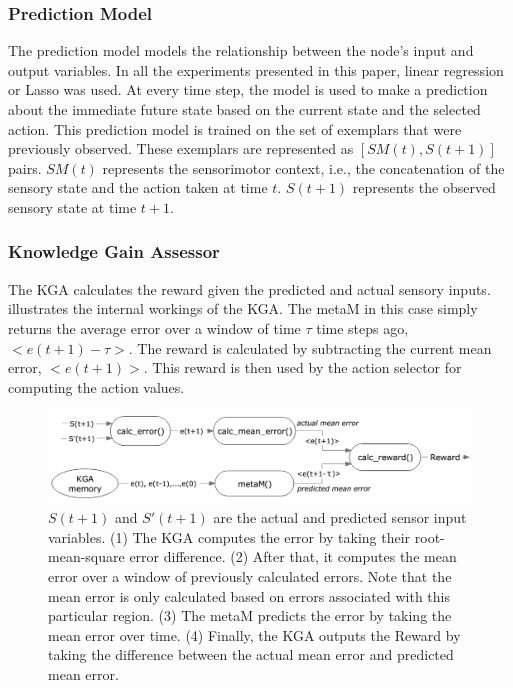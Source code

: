 \subsubsection{Prediction Model}

The prediction model models the relationship between the node's input and output variables. In all the experiments presented in this paper, linear regression or Lasso was used. At every time step, the model is used to make a prediction about the immediate future state based on the current state and the selected action. This prediction model is trained on the set of exemplars that were previously observed. These exemplars are represented as $[SM(t),S(t+1)]$ pairs. $SM(t)$ represents the sensorimotor context, i.e., the concatenation of the sensory state and the action taken at time $t$. $S(t+1)$ represents the observed sensory state at time $t+1$. 

\subsubsection{Knowledge Gain Assessor}

The KGA calculates the reward given the predicted and actual sensory inputs.  illustrates the internal workings of the KGA. The metaM in this case simply returns the average error over a window of time $\tau$ time steps ago, $<e(t+1)-\tau>$. The reward is calculated by subtracting the current mean error, $<e(t+1)>$. This reward is then used by the action selector for computing the action values. 

\begin{figure}[htbp]
	\centering
	\includegraphics[width=1.0 \textwidth]{"fig/cbla/Block Diagram KGA"}
	\caption[Block diagram of the Knowledge Gain Assessor]{$S(t+1)$ and $S'(t+1)$ are the actual and predicted sensor input variables. (1) The KGA computes the error by taking their root-mean-square error difference. (2) After that, it computes the mean error over a window of previously calculated errors. Note that the mean error is only calculated based on errors associated with this particular region. (3) The metaM predicts the error by taking the mean error over time. (4) Finally, the KGA outputs the Reward by taking the difference between the actual mean error and predicted mean error. }
	\label{fig:Block Diagram KGA}
\end{figure}

